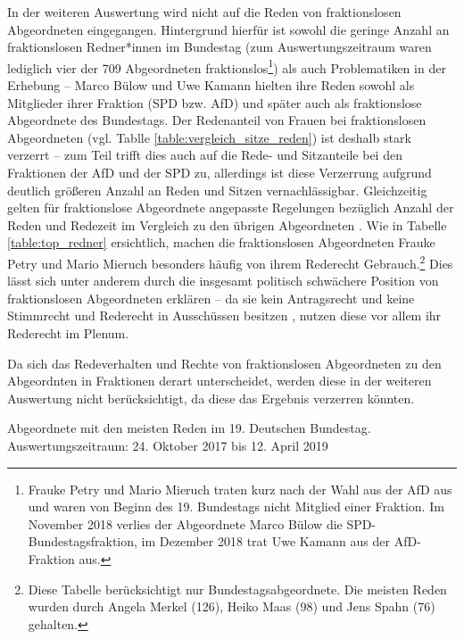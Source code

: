 \documentclass[12pt, 
    twoside=false, 
    bibliography=totoc, 
    numbers=endperiod, 
    headings=normal, 
    toc=chapterentrydotfill
    ]{scrbook}
\begin{document}
In der weiteren Auswertung wird nicht auf die Reden von fraktionslosen Abgeordneten eingegangen. Hintergrund hierfür ist sowohl die geringe Anzahl an fraktionslosen Redner*innen im Bundestag (zum Auswertungszeitraum waren lediglich vier der 709 Abgeordneten fraktionslos\footnote{Frauke Petry und Mario Mieruch traten kurz nach der Wahl aus der AfD aus und waren von Beginn des 19. Bundestags nicht Mitglied einer Fraktion. Im November 2018 verlies der Abgeordnete Marco Bülow die SPD-Bundestagsfraktion, im Dezember 2018 trat Uwe Kamann aus der AfD-Fraktion aus.}) als auch Problematiken in der Erhebung -- Marco Bülow und Uwe Kamann hielten ihre Reden sowohl als Mitglieder ihrer Fraktion (SPD bzw. AfD) und später auch als fraktionslose Abgeordnete des Bundestags. Der Redenanteil von Frauen bei fraktionslosen Abgeordneten (vgl. Tablle \ref{table:vergleich_sitze_reden}) ist deshalb stark verzerrt -- zum Teil trifft dies auch auf die Rede- und Sitzanteile bei den Fraktionen der AfD und der SPD zu, allerdings ist diese Verzerrung aufgrund deutlich größeren Anzahl an Reden und Sitzen vernachlässigbar.
Gleichzeitig gelten für fraktionslose Abgeordnete angepasste Regelungen bezüglich Anzahl der Reden und Redezeit im Vergleich zu den übrigen Abgeordneten \parencite[vgl.][583f.]{schreiner_2005}. Wie in Tabelle \ref{table:top_redner} ersichtlich, machen die fraktionslosen Abgeordneten Frauke Petry und Mario Mieruch besonders häufig von ihrem Rederecht Gebrauch.\footnote{Diese Tabelle berücksichtigt nur Bundestagsabgeordnete. Die meisten Reden wurden durch Angela Merkel (126), Heiko Maas (98) und Jens Spahn (76) gehalten.} Dies lässt sich unter anderem durch die insgesamt politisch schwächere Position von fraktionslosen Abgeordneten erklären \parencite[372]{morlok_2018} -- da sie kein Antragsrecht und keine Stimmrecht und Rederecht in Ausschüssen besitzen \parencite[vgl.][]{morlok_2018}, nutzen diese vor allem ihr Rederecht im Plenum.

Da sich das Redeverhalten und Rechte von fraktionslosen Abgeordneten zu den Abgeordnten in Fraktionen derart unterscheidet, werden diese in der weiteren Auswertung nicht berücksichtigt, da diese das Ergebnis verzerren könnten.

\begin{table}[htb]
    \centering
    \caption[Abgeordnete mit den meisten Reden im 19. Deutschen Bundestag.]{Abgeordnete mit den meisten Reden im 19. Deutschen Bundestag. Auswertungszeitraum: 24. Oktober 2017 bis 12. April 2019}
    
    \label{table:top_redner}
\end{table}
\end{document}
